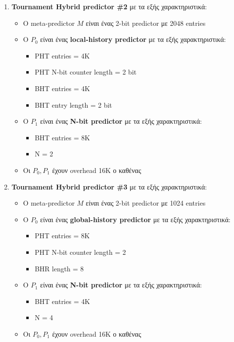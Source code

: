 \documentclass[12pt,a4paper]{article}
\begin{document}
\begin{enumerate}
				\item \textbf{Tournament Hybrid predictor \#2} με τα εξής χαρακτηριστικά:
					\begin{itemize}
						\item Ο meta-predictor $M$ είναι ένας 2-bit predictor με 2048 entries
						\item Ο $P_0$ είναι ένας \textbf{local-history predictor} με τα εξής χαρακτηριστικά:
							\begin{itemize}
								\item PHT entries = 4K
								\item PHT N-bit counter length = 2 bit
								\item BHT entries = 4K
								\item BHT entry length = 2 bit
							\end{itemize}
						\item Ο $P_1$ είναι ένας \textbf{N-bit predictor} με τα εξής χαρακτηριστικά:
							\begin{itemize}
								\item BHT entries = 8K 
								\item N = 2
							\end{itemize}
						\item Οι $P_0, P_1$ έχουν overhead 16K ο καθένας
					\end{itemize}
				
				\item \textbf{Tournament Hybrid predictor \#3} με τα εξής χαρακτηριστικά:
					\begin{itemize}
						\item Ο meta-predictor $M$ είναι ένας 2-bit predictor με 1024 entries
						\item Ο $P_0$ είναι ένας \textbf{global-history predictor} με τα εξής χαρακτηριστικά:
							\begin{itemize}
								\item PHT entries = 8K
								\item PHT N-bit counter length = 2
								\item BHR length = 8
							\end{itemize}
						\item Ο $P_1$ είναι ένας \textbf{N-bit predictor} με τα εξής χαρακτηριστικά:
							\begin{itemize}
								\item BHT entries = 4K 
								\item N = 4
							\end{itemize}
						\item Οι $P_0, P_1$ έχουν overhead 16K ο καθένας
					\end{itemize}
				

\end{enumerate}
\end{document}
